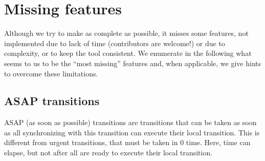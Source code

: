\chapter{Missing features}

Although we try to make \imitator{} as complete as possible, it misses some features, not implemented due to lack of time (contributors are welcome!) or due to complexity, or to keep the tool consistent.
We enumerate in the following what seems to us to be the ``most missing'' features and, when applicable, we give hints to overcome these limitations.


%




\section{ASAP transitions}

ASAP (as soon as possible) transitions are transitions that can be taken as soon as all \IPTA{} synchronizing with this transition can execute their local transition.
This is different from urgent transitions, that must be taken in 0 time.
Here, time can elapse, but not after all \IPTA{} are ready to execute their local transition.

